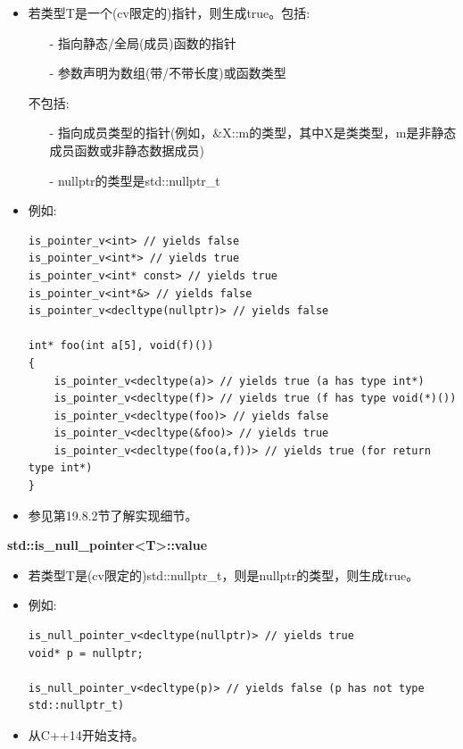\begin{itemize}
\item 
若类型T是一个(cv限定的)指针，则生成true。包括:
\begin{itemize}

\item[-] 
指向静态/全局(成员)函数的指针

\item[-] 
参数声明为数组(带/不带长度)或函数类型
\end{itemize}

不包括:

\begin{itemize}
\item[-] 
指向成员类型的指针(例如，\&X::m的类型，其中X是类类型，m是非静态成员函数或非静态数据成员)

\item[-] 
nullptr的类型是std::nullptr\_t
\end{itemize}

\item 
例如:

\begin{lstlisting}[style=styleCXX]
is_pointer_v<int> // yields false
is_pointer_v<int*> // yields true
is_pointer_v<int* const> // yields true
is_pointer_v<int*&> // yields false
is_pointer_v<decltype(nullptr)> // yields false

int* foo(int a[5], void(f)())
{
	is_pointer_v<decltype(a)> // yields true (a has type int*)
	is_pointer_v<decltype(f)> // yields true (f has type void(*)())
	is_pointer_v<decltype(foo)> // yields false
	is_pointer_v<decltype(&foo)> // yields true
	is_pointer_v<decltype(foo(a,f))> // yields true (for return type int*)
}
\end{lstlisting}

\item 
参见第19.8.2节了解实现细节。
\end{itemize}

\textbf{std::is\_null\_pointer<T>::value}

\begin{itemize}
\item 
若类型T是(cv限定的)std::nullptr\_t，则是nullptr的类型，则生成true。

\item 
例如:
\begin{lstlisting}[style=styleCXX]
is_null_pointer_v<decltype(nullptr)> // yields true
void* p = nullptr;

is_null_pointer_v<decltype(p)> // yields false (p has not type std::nullptr_t)
\end{lstlisting}

\item 
从C++14开始支持。
\end{itemize}

